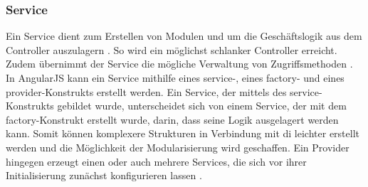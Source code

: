 \subsubsection{Service}

Ein Service dient zum Erstellen von Modulen und um die Geschäftslogik aus dem Controller auszulagern \cite[S. 333]{ste15}. So wird ein möglichst schlanker Controller erreicht. Zudem übernimmt der Service die mögliche Verwaltung von Zugriffsmethoden \cite[S. 265]{ste15}.\\
In AngularJS kann ein Service mithilfe eines service-, eines factory- und eines provider-Konstrukts erstellt werden. Ein Service, der mittels des service-Konstrukts gebildet wurde, unterscheidet sich von einem Service, der mit dem factory-Konstrukt erstellt wurde, darin, dass seine Logik ausgelagert werden kann. Somit können komplexere Strukturen in Verbindung mit \ac{di} leichter erstellt werden und die Möglichkeit der Modularisierung wird geschaffen. Ein Provider hingegen erzeugt einen oder auch mehrere Services, die sich vor ihrer Initialisierung zunächst konfigurieren lassen \cite[S. 340 f.]{ste15}.